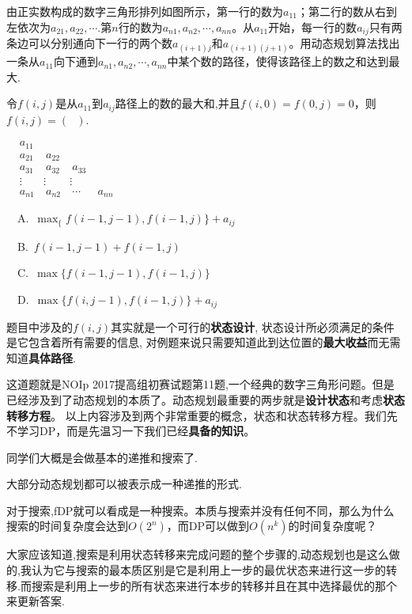 \begin{example}由正实数构成的数字三角形排列如图所示，第一行的数为$a_{11}$；第二行的数从右到左依次为$a_{21},a_{22},\cdots$.第$n$行的数为$a_{n1},a_{n2},\cdots,a_{nn}$。从$a_{11}$开始，每一行的数$a_{ij}$只有两条边可以分别通向下一行的两个数$a_{(i+1)j}$和$a_{(i+1)(j+1)}$。用动态规划算法找出一条从$a_{11}$向下通到$a_{n1},a_{n2},\cdots,a_{nn}$中某个数的路径，使得该路径上的数之和达到最大.
	
	令$f(i,j)$是从$a_{11}$到$a_{ij}$路径上的数的最大和,并且$f(i,0)=f(0,j)=0$，则$f(i,j)=(\ \ \ )$.
	\begin{center}
		\begin{math}
		\begin{matrix}
		&a_{11}&         \\
		&a_{21}&\ a_{22}         \\
		&a_{31}&\ a_{32}&\ a_{33} \\
		&\vdots&\vdots&\vdots&       \\
		&a_{n1}&\ a_{n2}&\ \cdots&\ a_{nn}
		\end{matrix}
		\end{math}
	\end{center}
	
	\ \ A.\ $\max_\{f(i-1,j-1),f(i-1,j)\}+a_{ij}$
	
	\ \ B.\ $f(i-1,j-1)+f(i-1,j)$
	
	\ \ C.\ $\max\{f(i-1,j-1),f(i-1,j)\}$
	
	\ \ D.\ $\max\{f(i,j-1),f(i-1,j)\}+a_{ij}$
\end{example}

题目中涉及的$f(i,j)$其实就是一个可行的\textbf{状态设计}, 状态设计所必须满足的条件是它包含着所有需要的信息, 对例题来说只需要知道此到达位置的\textbf{最大收益}而无需知道\textbf{具体路径}.

这道题就是NOIp 2017提高组初赛试题第11题,一个经典的数字三角形问题。但是已经涉及到了动态规划的本质了。动态规划最重要的两步就是\textbf{设计状态}和考虑\textbf{状态转移方程}。
以上内容涉及到两个非常重要的概念，状态和状态转移方程。我们先不学习DP，而是先温习一下我们已经\textbf{具备的知识}。

同学们大概是会做基本的递推和搜索了.

大部分动态规划都可以被表示成一种递推的形式.

对于搜索,fDP就可以看成是一种搜索。本质与搜索并没有任何不同，那么为什么搜索的时间复杂度会达到$O(2^n)$，而DP可以做到$O(n^k)$的时间复杂度呢？

大家应该知道,搜索是利用状态转移来完成问题的整个步骤的,动态规划也是这么做的,我认为它与搜索的最本质区别是它是利用上一步的最优状态来进行这一步的转移.而搜索是利用上一步的所有状态来进行本步的转移并且在其中选择最优的那个来更新答案.

